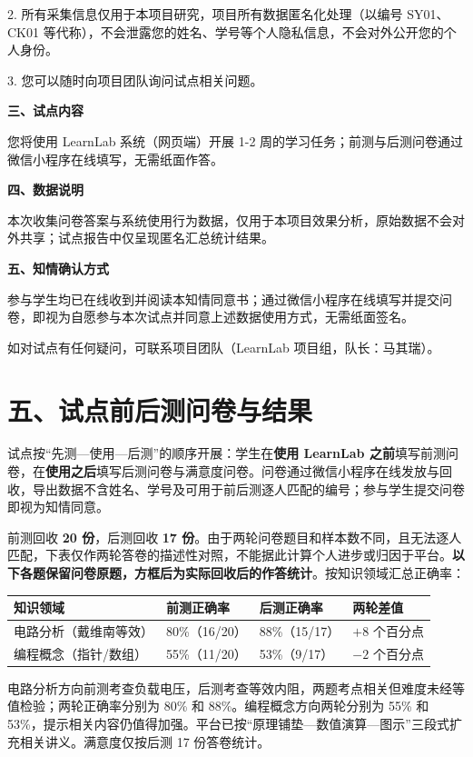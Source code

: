 \documentclass[zihao=-4,a4paper,UTF8,fontset=windows]{ctexart}
\begin{document}
2. 所有采集信息仅用于本项目研究，项目所有数据匿名化处理（以编号 SY01、CK01 等代称），不会泄露您的姓名、学号等个人隐私信息，不会对外公开您的个人身份。

3. 您可以随时向项目团队询问试点相关问题。

\textbf{三、试点内容}

您将使用 LearnLab 系统（网页端）开展 1-2 周的学习任务；前测与后测问卷通过微信小程序在线填写，无需纸面作答。

\textbf{四、数据说明}

本次收集问卷答案与系统使用行为数据，仅用于本项目效果分析，原始数据不会对外共享；试点报告中仅呈现匿名汇总统计结果。

\textbf{五、知情确认方式}

参与学生均已在线收到并阅读本知情同意书；通过微信小程序在线填写并提交问卷，即视为自愿参与本次试点并同意上述数据使用方式，无需纸面签名。

如对试点有任何疑问，可联系项目团队（LearnLab 项目组，队长：马其瑞）。

\section{五、试点前后测问卷与结果}

试点按“先测—使用—后测”的顺序开展：学生在\textbf{使用 LearnLab 之前}填写前测问卷，在\textbf{使用之后}填写后测问卷与满意度问卷。问卷通过微信小程序在线发放与回收，导出数据不含姓名、学号及可用于前后测逐人匹配的编号；参与学生提交问卷即视为知情同意。

前测回收 \textbf{20 份}，后测回收 \textbf{17 份}。由于两轮问卷题目和样本数不同，且无法逐人匹配，下表仅作两轮答卷的描述性对照，不能据此计算个人进步或归因于平台。\textbf{以下各题保留问卷原题，方框后为实际回收后的作答统计}。按知识领域汇总正确率：

\par\noindent\begin{tabular}{|p{4.6cm}|p{2.8cm}|p{2.8cm}|p{2.6cm}|}
\hline
\textbf{知识领域} & \textbf{前测正确率} & \textbf{后测正确率} & \textbf{两轮差值} \\ \hline
电路分析（戴维南等效） & 80\%（16/20） & 88\%（15/17） & ${+}8$ 个百分点 \\ \hline
编程概念（指针/数组） & 55\%（11/20） & 53\%（9/17） & ${-}2$ 个百分点 \\ \hline
\end{tabular}\par

电路分析方向前测考查负载电压，后测考查等效内阻，两题考点相关但难度未经等值检验；两轮正确率分别为 80\% 和 88\%。编程概念方向两轮分别为 55\% 和 53\%，提示相关内容仍值得加强。平台已按“原理铺垫—数值演算—图示”三段式扩充相关讲义。满意度仅按后测 17 份答卷统计。
\end{document}
